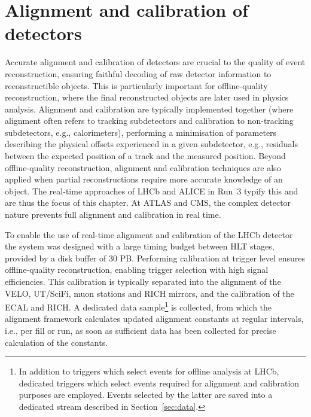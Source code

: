 \section{Alignment and calibration of detectors}

Accurate alignment and calibration of detectors are crucial to the quality of event reconstruction, ensuring faithful decoding of raw detector information to reconstructible objects. This is particularly important for offline-quality reconstruction, where the final reconstructed objects are later used in physics analysis. Alignment and calibration are typically implemented together (where alignment often refers to tracking subdetectors and calibration to non-tracking subdetectors, e.g., calorimeters), performing a minimisation of parameters describing the physical offsets experienced in a given subdetector, e.g., residuals between the expected position of a track and the measured position. Beyond offline-quality reconstruction, alignment and calibration techniques are also applied when partial reconstructions require more accurate knowledge of an object. The real-time approaches of LHCb and ALICE in Run~3 typify this and are thus the focus of this chapter. At ATLAS and CMS, the complex detector nature prevents full alignment and calibration in real time.

To enable the use of real-time alignment and calibration of the LHCb detector the system was designed with a large timing budget between HLT stages, provided by a disk buffer of 30 PB. Performing calibration at trigger level ensures offline-quality reconstruction, enabling trigger selection with high signal efficiencies. This calibration is typically separated into the alignment of the VELO, UT/SciFi, muon stations and RICH mirrors, and the calibration of the ECAL and RICH. A dedicated data sample\footnote{In addition to triggers which select events for offline analysis at LHCb, dedicated triggers which select events required for alignment and calibration purposes are employed. Events selected by the latter are saved into a dedicated stream described in Section~\ref{sec:data}.} is collected, from which the alignment framework calculates updated alignment constants at regular intervals, i.e., per fill or run, as soon as sufficient data has been collected for precise calculation of the constants.

